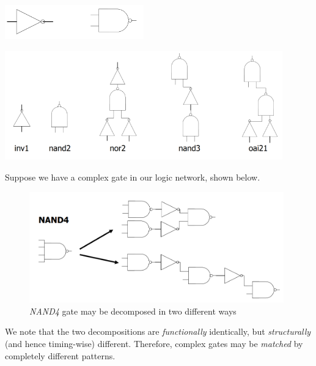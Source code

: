 \documentclass{article}
\begin{document}
\begin{minipage}[t]{0.3\textwidth}
    \centering
    \includegraphics[width=6cm, scale=1]{S3/basePrimitives.PNG}
    \captionsetup{justification=centering}
\end{minipage}%
\begin{minipage}[t]{0.7\textwidth}
    \centering
    \includegraphics[width=12cm, scale=1]{S3/decomposedLibrary.PNG}
    \captionsetup{justification=centering}
\end{minipage}

\vspace{0.25cm}
Suppose we have a complex gate in our logic network, shown below.

\begin{figure}[htp]
    \centering
    \includegraphics[width=11cm, scale=1]{S3/nand4_matching.PNG}
    \caption{\textit{NAND4} gate may be decomposed in two different ways}
\end{figure}

We note that the two decompositions are \textit{functionally} identically, but \textit{structurally} (and hence timing-wise) different.
Therefore, complex gates may be \textit{matched} by completely different patterns.
\end{document}

